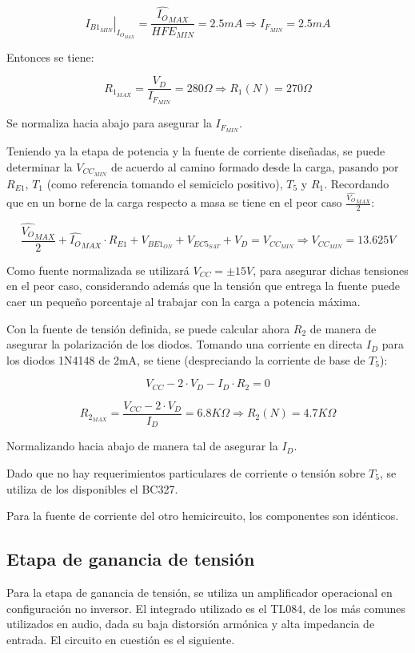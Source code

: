 \[
\left. I_{B1_{MIN}} \right|_{I_{O_{MAX}}} = \frac{\hat{I_O}_{MAX}}{HFE_{MIN}} = 2.5mA \Longrightarrow I_{F_{MIN}} = 2.5mA
\]

Entonces se tiene:

\[
R_{1_{MAX}} = \frac{V_D}{I_{F_{MIN}}} = 280\Omega \Longrightarrow R_1(N) = 270\Omega
\]

Se normaliza hacia abajo para asegurar la $I_{F_{MIN}}$.\par
Teniendo ya la etapa de potencia y la fuente de corriente diseñadas, se puede determinar la $V_{CC_{MIN}}$ de acuerdo al camino formado desde la carga, pasando por $R_{E1}$, $T_1$ (como referencia tomando el semiciclo positivo), $T_5$ y $R_1$. Recordando que en un borne de la carga respecto a masa se tiene en el peor caso $\frac{\hat{V_O}_{MAX}}{2}$:

\[
\frac{\hat{V_O}_{MAX}}{2} + \hat{I_O}_{MAX} \cdot R_{E1} + V_{BE1_{ON}} + V_{EC5_{SAT}} + V_D = V_{CC_{MIN}} \Longrightarrow V_{CC_{MIN}} = 13.625V
\]

Como fuente normalizada se utilizará $V_{CC} = \pm 15V$, para asegurar dichas tensiones en el peor caso, considerando además que la tensión que entrega la fuente puede caer un pequeño porcentaje al trabajar con la carga a potencia máxima.\par
Con la fuente de tensión definida, se puede calcular ahora $R_2$ de manera de asegurar la polarización de los diodos. Tomando una corriente en directa $I_D$ para los diodos 1N4148 de 2mA, se tiene (despreciando la corriente de base de $T_5$):

\[
V_{CC} - 2 \cdot V_D - I_D \cdot R_2 = 0
\]

\[
 R_{2_{MAX}} = \frac{V_{CC} - 2 \cdot V_D}{I_D} = 6.8K\Omega \Longrightarrow R_2(N) = 4.7K\Omega
\]

Normalizando hacia abajo de manera tal de asegurar la $I_D$.\par
Dado que no hay requerimientos particulares de corriente o tensión sobre $T_5$, se utiliza de los disponibles el BC327.\par
Para la fuente de corriente del otro hemicircuito, los componentes son idénticos.

\subsection{Etapa de ganancia de tensión}

Para la etapa de ganancia de tensión, se utiliza un amplificador operacional en configuración no inversor. El integrado utilizado es el TL084, de los más comunes utilizados en audio, dada su baja distorsión armónica y alta impedancia de entrada. El circuito en cuestión es el siguiente.

